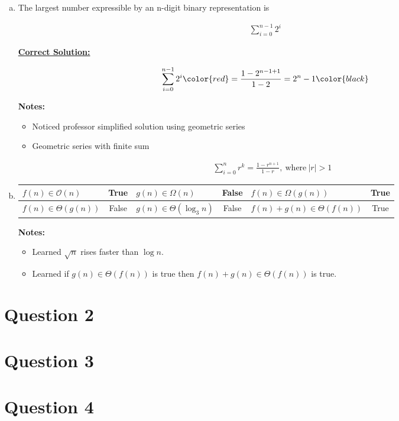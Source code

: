 \documentclass[12pt]{article}
\begin{document}
\begin{enumerate}[a.]
    \item The largest number expressible by an n-digit binary representation is

    \setcounter{equation}{0}
    \begin{align}
        \sum\limits_{i=0}^{n-1} 2^i
    \end{align}

    \begin{mdframed}
        \underline{\textbf{Correct Solution:}}

        \setcounter{equation}{0}
        \begin{align}
            \sum\limits_{i=0}^{n-1} 2^i \color{red}= \frac{1 - 2^{n-1+1}}{1-2} = 2^n-1\color{black}
        \end{align}
    \end{mdframed}

    \bigskip

    \textbf{Notes:}

    \begin{itemize}
        \item Noticed professor simplified solution using geometric series
        \item Geometric series with finite sum

        \begin{align}
            \sum\limits_{i=0}^{n} r^k = \frac{1-r^{n+1}}{1-r},\:\text{where}\:\lvert r \rvert > 1
        \end{align}
    \end{itemize}

    \item

    \begin{tabular}{|l|c|l|c|l|c|}
        \hline
        $f(n) \in \mathcal{O}(n)$ & True & $g(n) \in \Omega(n)$ & False & $f(n) \in \Omega(g(n))$ & True\\
        \hline
        $f(n) \in \Theta(g(n))$ & False & $g(n) \in \Theta(\log_3 n)$ & False & $f(n) + g(n) \in \Theta(f(n))$ & True\\
        \hline
    \end{tabular}

    \bigskip

    \textbf{Notes:}

    \begin{itemize}
        \item Learned $\sqrt{n}$ rises faster than $\log n$.
        \item Learned if $g(n) \in \Theta(f(n))$ is true then
        $f(n) + g(n) \in \Theta(f(n))$ is true.
    \end{itemize}

\end{enumerate}

\section*{Question 2}

\section*{Question 3}

\section*{Question 4}
\end{document}
